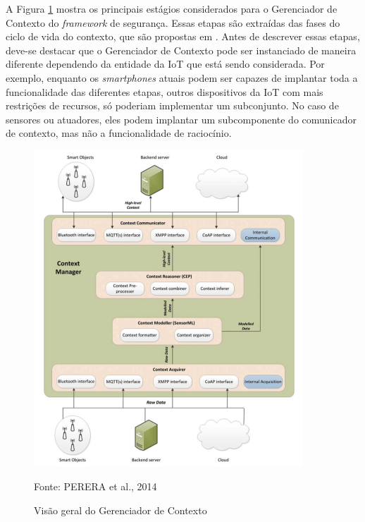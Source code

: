 \documentclass[tid,table]{texufpel} %
\begin{document}

A Figura \ref{context-manager-overview} mostra os principais estágios considerados para o Gerenciador de Contexto do \textit{framework} de segurança. Essas etapas são extraídas das fases do ciclo de vida do contexto, que são propostas em \cite{perera14}. Antes de descrever essas etapas, deve-se destacar que o Gerenciador de Contexto pode ser instanciado de maneira diferente dependendo da entidade da IoT que está sendo considerada. Por exemplo, enquanto os \textit{smartphones} atuais podem ser capazes de implantar toda a funcionalidade das diferentes etapas, outros dispositivos da IoT com mais restrições de recursos, só poderiam implementar um subconjunto. No caso de sensores ou atuadores, eles podem implantar um subcomponente do comunicador de contexto, mas não a funcionalidade de raciocínio.
 
 \begin{figure}[ht!]
\centering
\includegraphics[width=0.9\textwidth]{imagens/context-manager-overview.png}
\caption{Visão geral do Gerenciador de Contexto}
\label{context-manager-overview}
Fonte: PERERA et al., 2014
\end{figure}
\end{document}
